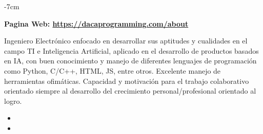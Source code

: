 \documentclass[10pt,a4paper]{altacv}
\begin{document}



\begin{adjustwidth}{}{-7cm}
\makecvheader
\end{adjustwidth}


\textbf{Pagina Web: \href{https://dacaprogramming.com/about}{https://dacaprogramming.com/about}}

Ingeniero Electrónico enfocado en desarrollar sus aptitudes y cualidades en el campo TI e Inteligencia Artificial, aplicado en el desarrollo de productos basados en IA, con buen conocimiento y manejo de diferentes lenguajes de programación como Python, C/C++, HTML, JS, entre otros. Excelente manejo de herramientas ofimáticas. Capacidad y motivación para el trabajo colaborativo orientado siempre al desarrollo del crecimiento personal/profesional orientado al logro.\\

\begin{itemize}
\item {}

\item {}
\end{itemize}
\end{document}
